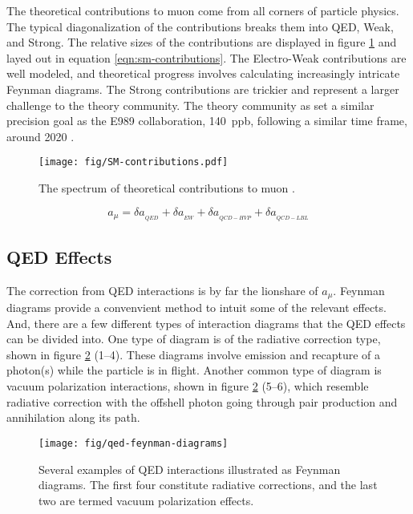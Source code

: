 The theoretical contributions to muon \gmtwo come from all corners of particle physics.  The typical diagonalization of the contributions breaks them into QED, Weak, and Strong. The relative sizes of the contributions are displayed in figure \ref{fig:sm-contributions} and layed out in equation \ref{eqn:sm-contributions}. The Electro-Weak contributions are well modeled, and theoretical progress involves calculating increasingly intricate Feynman diagrams.  The Strong contributions are trickier and represent a larger challenge to the theory community.  The theory community as set a similar precision goal as the E989 collaboration, \SI{140}{ppb}, following a similar time frame, around 2020 \cite{e989-tdr}.

\begin{figure}
\texttt{[image: fig/SM-contributions.pdf]}
\label{fig:sm-contributions}
\caption{The spectrum of theoretical contributions to muon \gmtwo.}
\end{figure}

\begin{equation}
\label{eqn:sm-contributions}
a_\mu = \delta a_{_{QED}} + \delta a_{_{EW}} + \delta a_{_{QCD-HVP}} + \delta a_{_{QCD-LBL}}
\end{equation}

\subsection{QED Effects} \label{s-sec:theory-qed}

The correction from QED interactions is by far the lionshare of $a_\mu$.  Feynman diagrams provide a convenvient method to intuit some of the relevant effects.  And, there are a few different types of interaction diagrams that the QED effects can be divided into.  One type of diagram is of the radiative correction type, shown in figure \ref{fig:qed-feynman-diagrams} (1\hbox{--}4).  These diagrams involve emission and recapture of a photon(s) while the particle is in flight.  Another common type of diagram is vacuum polarization interactions, shown in figure \ref{fig:qed-feynman-diagrams} (5\hbox{--}6), which resemble radiative correction with the offshell photon going through pair production and annihilation along its path.

\begin{figure}
\label{fig:qed-feynman-diagrams}
\texttt{[image: fig/qed-feynman-diagrams]}
\caption{Several examples of QED interactions illustrated as Feynman diagrams.  The first four constitute radiative corrections, and the last two are termed vacuum polarization effects. }
\end{figure}


